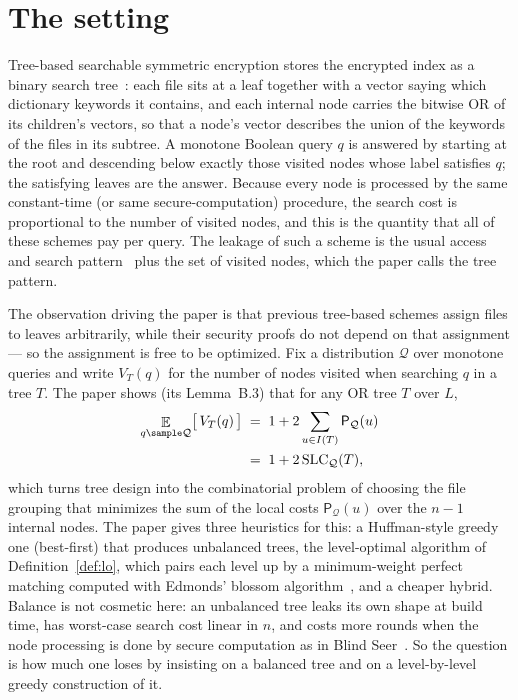 \documentclass{conjura-conjecture}
\newcommand{\Qd}{\mathcal{Q}}
\newcommand{\Pcost}{\mathsf{P}}
\newcommand{\SLC}{\mathrm{SLC}}
\newcommand{\Exp}{\mathop{\mathbb{E}}}
\begin{document}
\section{The setting}\label{sec:setting}

Tree-based searchable symmetric encryption stores the encrypted index as a
binary search tree~\cite{Goh03,KP13,BlindSeer}: each file sits at a leaf
together with a vector saying which dictionary keywords it contains, and
each internal node carries the bitwise OR of its children's vectors, so
that a node's vector describes the union of the keywords of the files in
its subtree. A monotone Boolean query $q$ is answered by starting at the
root and descending below exactly those visited nodes whose label satisfies
$q$; the satisfying leaves are the answer. Because every node is processed
by the same constant-time (or same secure-computation) procedure, the
search cost is proportional to the number of visited nodes, and this is the
quantity that all of these schemes pay per query. The leakage of such a
scheme is the usual access and search pattern~\cite{CGKO06} plus the set of
visited nodes, which the paper calls the tree pattern.

The observation driving the paper is that previous tree-based schemes
assign files to leaves arbitrarily, while their security proofs do not
depend on that assignment --- so the assignment is free to be optimized.
Fix a distribution $\Qd$ over monotone queries and write $V_T(q)$ for the
number of nodes visited when searching $q$ in a tree $T$. The paper shows
(its Lemma~B.3) that for any OR tree $T$ over $L$,
\begin{align*}
  \Exp_{q \sample \Qd}\bigl[\,V_T(q)\,\bigr]
    &\;=\; 1 + 2 \sum_{u \in I(T)} \Pcost_{\Qd}(u) \\
    &\;=\; 1 + 2\,\SLC_{\Qd}(T),
\end{align*}
which turns tree design into the combinatorial problem of choosing the file
grouping that minimizes the sum of the local costs $\Pcost_{\Qd}(u)$ over
the $n-1$ internal nodes. The paper gives three heuristics for this: a
Huffman-style greedy one (best-first) that produces unbalanced trees, the
level-optimal algorithm of Definition~\ref{def:lo}, which pairs each level
up by a minimum-weight perfect matching computed with Edmonds' blossom
algorithm~\cite{Edm65}, and a cheaper hybrid. Balance is not cosmetic here:
an unbalanced tree leaks its own shape at build time, has worst-case search
cost linear in $n$, and costs more rounds when the node processing is done
by secure computation as in Blind Seer~\cite{BlindSeer}. So the question is
how much one loses by insisting on a balanced tree and on a level-by-level
greedy construction of it.
\end{document}
